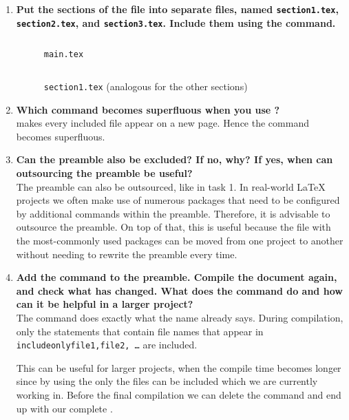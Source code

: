 \begin{enumerate}
  \item 
       \textbf{Put the sections of the file into separate files, named 
    	\texttt{section1.tex}, \texttt{section2.tex}, and 
    	\texttt{section3.tex}. 
    	Include them using the  \texttt{} command.}
    \begin{figure}[H]
      \inputminted[linenos=true]{latex}{exercises/project-structure/main-with-preamble.done.tex}
      \caption{\texttt{main.tex}}
    \end{figure}
    \begin{figure}[H]
      \inputminted[linenos=true,breaklines=true]{latex}{exercises/project-structure/section1.done.tex}
      \caption{\texttt{section1.tex} (analogous for the other 
      sections)}
  \end{figure}
    \item \textbf{Which command becomes superfluous when you use 
  	\texttt{}?} \\
  	\texttt{} makes every included file appear on a new 
  	page. Hence the command \texttt{\newpage} becomes superfluous.
  \item 
    \textbf{Can the preamble also be excluded? If no, why? If yes, when can 
    	outsourcing the preamble be useful?} \\
    The preamble can also be outsourced, like in task 1. In real-world \LaTeX{} 
    projects we often make use of numerous packages that need to be configured 
    by additional commands within the preamble. Therefore, it is advisable to 
    outsource the preamble. On top of that, this is useful because the file 
    with the most-commonly used packages can be moved from one project to 
    another without needing to rewrite the preamble every time.
  \item 
    \textbf{Add the command \texttt{} to the 
    preamble. Compile the document again, and check what has changed. What does 
    the command do and how can it be helpful in a larger project? } \\
	The command \texttt{} does exactly what 
	the name already says. During compilation, only the 
	\texttt{} 
	statements that contain file names that appear in 
	\texttt{includeonly{file1,file2, …}} are included.
	
	This can be useful for larger projects, when the compile time becomes 
	longer since by using the \texttt{} only the files 
	can be included which we are currently working in. Before the final 
	compilation we can delete the \texttt{} command and 
	end up with our complete .
    
\end{enumerate}